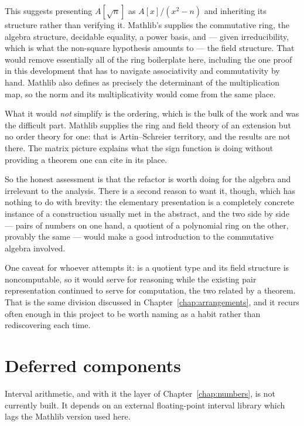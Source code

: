 This suggests presenting $A[\sqrt{n}]$ as $A[x]/(x^2 - n)$ and inheriting its
structure rather than verifying it. Mathlib's  supplies the
commutative ring, the algebra structure, decidable equality, a power basis, and
--- given irreducibility, which is what the non-square hypothesis amounts to ---
the field structure. That would remove essentially all of the ring boilerplate
here, including the one proof in this development that has to navigate
associativity and commutativity by hand. Mathlib also defines 
as precisely the determinant of the multiplication map, so the norm and its
multiplicativity would come from the same place.

What it would \emph{not} simplify is the ordering, which is the bulk of the work
and was the difficult part. Mathlib supplies the ring and field theory of an
extension but no order theory for one: that is Artin--Schreier territory, and
the results are not there. The matrix picture explains what the sign function is
doing without providing a theorem one can cite in its place.

So the honest assessment is that the refactor is worth doing for the algebra and
irrelevant to the analysis. There is a second reason to want it, though, which
has nothing to do with brevity: the elementary presentation is a completely
concrete instance of a construction usually met in the abstract, and the two
side by side --- pairs of numbers on one hand, a quotient of a polynomial ring
on the other, provably the same --- would make a good introduction to the
commutative algebra involved.

One caveat for whoever attempts it:  is a quotient type and its
field structure is noncomputable, so it would serve for reasoning while the
existing pair representation continued to serve for computation, the two related
by a theorem. That is the same division discussed in
Chapter~\ref{chap:arrangements}, and it recurs often enough in this project to
be worth naming as a habit rather than rediscovering each time.

\section{Deferred components}

Interval arithmetic, and with it the  layer of
Chapter~\ref{chap:numbers}, is not currently built. It depends on an external
floating-point interval library which lags the Mathlib version used here.

